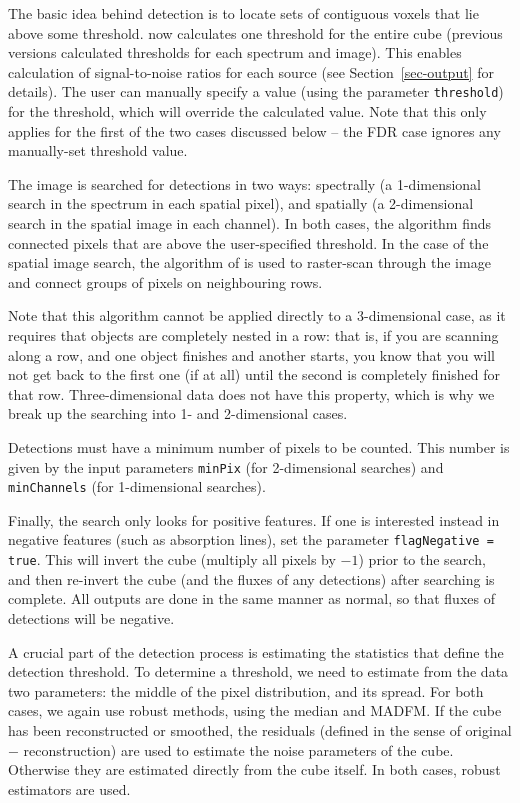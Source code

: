 \label{sec-detection}

The basic idea behind detection is to locate sets of contiguous voxels
that lie above some threshold. \duchamp now calculates one threshold
for the entire cube (previous versions calculated thresholds for each
spectrum and image). This enables calculation of signal-to-noise
ratios for each source (see Section~\ref{sec-output} for details). The
user can manually specify a value (using the parameter
\texttt{threshold}) for the threshold, which will override the
calculated value. Note that this only applies for the first of the two
cases discussed below -- the FDR case ignores any manually-set
threshold value.

The image is searched for detections in two ways: spectrally (\ie a
1-dimensional search in the spectrum in each spatial pixel), and
spatially (a 2-dimensional search in the spatial image in each
channel). In both cases, the algorithm finds connected pixels that are
above the user-specified threshold. In the case of the spatial image
search, the algorithm of \citet{lutz80} is used to raster-scan through
the image and connect groups of pixels on neighbouring rows.

Note that this algorithm cannot be applied directly to a 3-dimensional
case, as it requires that objects are completely nested in a row: that
is, if you are scanning along a row, and one object finishes and
another starts, you know that you will not get back to the first one
(if at all) until the second is completely finished for that
row. Three-dimensional data does not have this property, which is why
we break up the searching into 1- and 2-dimensional cases.

Detections must have a minimum number of pixels to be counted. This
number is given by the input parameters \texttt{minPix} (for
2-dimensional searches) and \texttt{minChannels} (for 1-dimensional
searches).

Finally, the search only looks for positive features. If one is
interested instead in negative features (such as absorption lines),
set the parameter \texttt{flagNegative = true}. This will invert the
cube (\ie multiply all pixels by $-1$) prior to the search, and then
re-invert the cube (and the fluxes of any detections) after searching
is complete. All outputs are done in the same manner as normal, so
that fluxes of detections will be negative.


A crucial part of the detection process is estimating the statistics
that define the detection threshold. To determine a threshold, we need
to estimate from the data two parameters: the middle of the pixel
distribution, and its spread. For both cases, we again use robust
methods, using the median and MADFM. If the cube has been
reconstructed or smoothed, the residuals (defined in the sense of
original $-$ reconstruction) are used to estimate the noise parameters
of the cube. Otherwise they are estimated directly from the cube
itself. In both cases, robust estimators are used.


